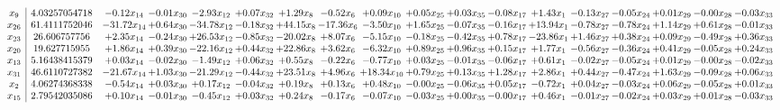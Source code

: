 \documentclass[9pt]{article}
\begin{document}
 \[\begin{array}{c| c c@{\hskip 2pt} c@{\hskip 2pt} c@{\hskip 2pt} c@{\hskip 2pt} c@{\hskip 2pt} c@{\hskip 2pt} c@{\hskip 2pt} c@{\hskip 2pt} c@{\hskip 2pt} c@{\hskip 2pt} c@{\hskip 2pt} c@{\hskip 2pt} c@{\hskip 2pt} c@{\hskip 2pt} c@{\hskip 2pt} c@{\hskip 2pt} }
 x_{9}   &  4.03257054718 & -0.12 x_{14} & -0.01 x_{30} & -2.93 x_{12} & +  0.07 x_{32} & +  1.29 x_{8} & -0.52 x_{6} & +  0.09 x_{10} & +  0.05 x_{25} & +  0.03 x_{35} & -0.08 x_{17} & +  1.43 x_{1} & -0.13 x_{27} & -0.05 x_{24} & +  0.01 x_{29} & -0.00 x_{28} & -0.03 x_{33}\\
 x_{26}   &  61.4111752046 & -31.72 x_{14} & +  0.64 x_{30} & -34.78 x_{12} & -0.18 x_{32} & + 44.15 x_{8} & -17.36 x_{6} & -3.50 x_{10} & +  1.65 x_{25} & -0.07 x_{35} & -0.16 x_{17} & + 13.94 x_{1} & -0.78 x_{27} & -0.78 x_{24} & +  1.14 x_{29} & +  0.61 x_{28} & -0.01 x_{33}\\
 x_{23}   &  26.606757756 & +  2.35 x_{14} & -0.24 x_{30} & + 26.53 x_{12} & -0.85 x_{32} & -20.02 x_{8} & +  8.07 x_{6} & -5.15 x_{10} & -0.18 x_{25} & -0.42 x_{35} & +  0.78 x_{17} & -23.86 x_{1} & +  1.46 x_{27} & +  0.38 x_{24} & +  0.09 x_{29} & -0.49 x_{28} & +  0.36 x_{33}\\
 x_{20}   &  19.627715955 & +  1.86 x_{14} & +  0.39 x_{30} & -22.16 x_{12} & +  0.44 x_{32} & + 22.86 x_{8} & +  3.62 x_{6} & -6.32 x_{10} & +  0.89 x_{25} & +  0.96 x_{35} & +  0.15 x_{17} & +  1.77 x_{1} & -0.56 x_{27} & -0.36 x_{24} & +  0.41 x_{29} & -0.05 x_{28} & +  0.24 x_{33}\\
 x_{13}   &  5.16438415379 & +  0.03 x_{14} & -0.02 x_{30} & -1.49 x_{12} & +  0.06 x_{32} & +  0.55 x_{8} & -0.22 x_{6} & -0.77 x_{10} & +  0.03 x_{25} & -0.01 x_{35} & -0.06 x_{17} & +  0.61 x_{1} & -0.02 x_{27} & -0.05 x_{24} & +  0.01 x_{29} & -0.00 x_{28} & -0.02 x_{33}\\
 x_{31}   &  46.6110727382 & -21.67 x_{14} & +  1.03 x_{30} & -21.29 x_{12} & -0.44 x_{32} & + 23.51 x_{8} & +  4.96 x_{6} & + 18.34 x_{10} & +  0.79 x_{25} & +  0.13 x_{35} & +  1.28 x_{17} & +  2.86 x_{1} & +  0.44 x_{27} & -0.47 x_{24} & +  1.63 x_{29} & -0.09 x_{28} & +  0.06 x_{33}\\
 x_{2}   &  4.06274368338 & -0.54 x_{14} & +  0.03 x_{30} & +  0.17 x_{12} & -0.04 x_{32} & +  0.19 x_{8} & +  0.13 x_{6} & +  0.48 x_{10} & -0.00 x_{25} & -0.06 x_{35} & +  0.05 x_{17} & -0.72 x_{1} & +  0.04 x_{27} & -0.03 x_{24} & +  0.06 x_{29} & -0.05 x_{28} & +  0.01 x_{33}\\
 x_{15}   &  2.79542035086 & +  0.10 x_{14} & -0.01 x_{30} & -0.45 x_{12} & +  0.03 x_{32} & +  0.24 x_{8} & -0.17 x_{6} & -0.07 x_{10} & -0.03 x_{25} & +  0.00 x_{35} & -0.00 x_{17} & +  0.46 x_{1} & -0.01 x_{27} & -0.02 x_{24} & +  0.03 x_{29} & +  0.01 x_{28} & -0.03 x_{33}\\

\end{array}\]
\end{document}
